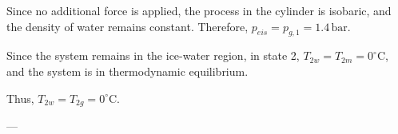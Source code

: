 Since no additional force is applied, the process in the cylinder is isobaric, and the density of water remains constant. Therefore, \( p_{eis} = p_{g,1} = 1.4 \, \text{bar} \).  

Since the system remains in the ice-water region, in state 2, \( T_{2w} = T_{2m} = 0^\circ \text{C} \), and the system is in thermodynamic equilibrium.  

Thus, \( T_{2w} = T_{2g} = 0^\circ \text{C} \).  

---